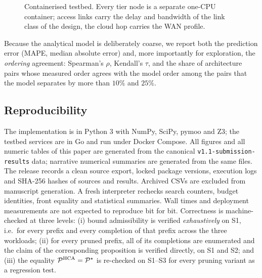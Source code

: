 \begin{figure}[t]
\centering
{}
\caption{Containerised testbed. Every tier node is a separate one-CPU container; access
links carry the delay and bandwidth of the link class of the design, the cloud hop
carries the WAN profile.}
\label{fig:testbed}
\end{figure}

Because the analytical model is deliberately coarse, we report both the prediction error
(MAPE, median absolute error) and, more importantly for exploration, the \emph{ordering}
agreement: Spearman's $\rho$, Kendall's $\tau$, and the share of architecture pairs whose
measured order agrees with the model order among the pairs that the model separates by
more than $10\%$ and $25\%$.

\subsection{Reproducibility}
The implementation is in Python 3 with NumPy, SciPy, pymoo and Z3; the testbed services are
in Go and run under Docker Compose. All figures and all numeric tables of this paper are
generated from the canonical \texttt{v1.1-submission-results} data; narrative numerical
summaries are generated from the same files. The release records a clean source export,
locked package versions, execution logs and SHA-256 hashes of sources and results.
Archived CSVs are excluded from manuscript generation. A fresh interpreter rechecks
search counters, budget identities, front equality and statistical summaries. Wall times
and deployment measurements are not expected to reproduce bit for bit. Correctness is machine-checked at three levels: (i) bound admissibility is verified
\emph{exhaustively} on S1, i.e.\ for every prefix and every completion of that prefix
across the three workloads; (ii) for every pruned prefix, all of its completions are
enumerated and the claim of the corresponding proposition is verified directly, on S1 and
S2; and (iii) the equality $\mathcal{P}^{\mathrm{HCA}}=\mathcal{P}^{\star}$ is re-checked on S1--S3 for
every pruning variant as a regression test.
